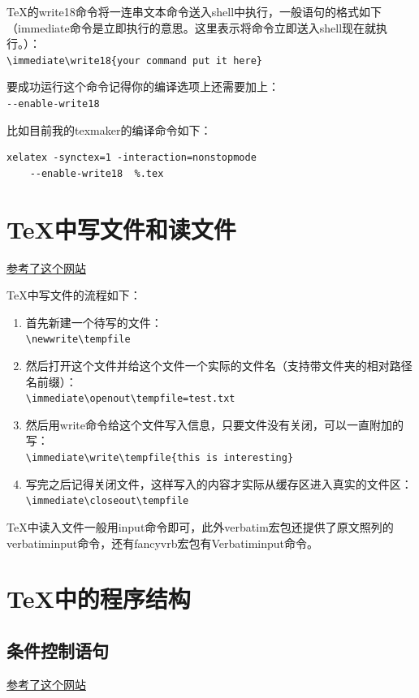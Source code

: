 \documentclass[11pt,oneside]{book}
\begin{document}
\TeX 的write18命令将一连串文本命令送入shell中执行，一般语句的格式如下（immediate命令是立即执行的意思。这里表示将命令立即送入shell现在就执行。）：\\
\verb+\immediate\write18{your command put it here}+

要成功运行这个命令记得你的编译选项上还需要加上：\\
\verb+--enable-write18+

比如目前我的texmaker的编译命令如下：
\begin{Verbatim}
xelatex -synctex=1 -interaction=nonstopmode 
    --enable-write18  %.tex
\end{Verbatim}


\section{TeX中写文件和读文件}
\href{http://stackoverflow.com/questions/2115379/write-and-read-from-a-latex-temporary-file}{参考了这个网站}

TeX中写文件的流程如下： 
\begin{enumerate}
\item 首先新建一个待写的文件：\\
\verb+\newwrite\tempfile+
\item 然后打开这个文件并给这个文件一个实际的文件名（支持带文件夹的相对路径名前缀）：\\
\verb+\immediate\openout\tempfile=test.txt+
\item 然后用write命令给这个文件写入信息，只要文件没有关闭，可以一直附加的写：\\
\verb+\immediate\write\tempfile{this is interesting}+
\item 写完之后记得关闭文件，这样写入的内容才实际从缓存区进入真实的文件区：\\
\verb+\immediate\closeout\tempfile+
\end{enumerate}

TeX中读入文件一般用input命令即可，此外verbatim宏包还提供了原文照列的verbatiminput命令，还有fancyvrb宏包有Verbatiminput命令。

\section{TeX中的程序结构}
\subsection{条件控制语句}
\label{sec:条件控制语句}
\href{http://handyfloss.wordpress.com/2007/08/29/latex-programming-how-to-implement-conditionals/}{参考了这个网站}
\end{document}

